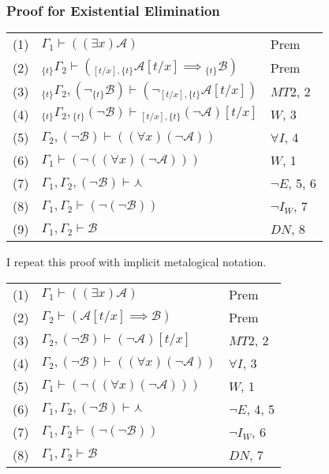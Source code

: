 \documentclass[12pt]{article}
\newcommand{\mc}[1]{\mathcal{#1}}
\begin{document}
\subsubsection*{Proof for Existential Elimination}

\begin{center}
\begin{tabular}{ p{1cm} p{7cm} p{3cm} }
(1) & $\Gamma_1 \vdash ((\exists x)\mc{A})$ & Prem\\
(2) & $_{\{t\}}\Gamma_2 \vdash ({_{[t/x], \{t\}}\mc{A}}[t/x] \implies {_{\{t\}}\mc{B}})$  & Prem\\
(3) & $_{\{t\}}\Gamma_2,  (\lnot {_{\{t\}}\mc{B}}) \vdash (\lnot {_{[t/x], \{t\}}\mc{A}}[t/x])$ & $MT2$, 2\\
(4) & $_{\{t\}} \Gamma_2, {_{\{t\}}(\lnot \mc{B})} \vdash {_{[t/x], \{t\}}(\lnot \mc{A})}[t/x]$ & $W$, 3\\
(5) & $\Gamma_2, (\lnot \mc{B}) \vdash ((\forall x)(\lnot \mc{A}))$ & $\forall I$, 4\\
(6) & $\Gamma_1 \vdash (\lnot ((\forall x)(\lnot \mc{A})))$ & $W$, 1\\
(7) & $\Gamma_1, \Gamma_2, (\lnot \mc{B}) \vdash \curlywedge$ & $\lnot E$, 5, 6\\
(8) & $\Gamma_1, \Gamma_2 \vdash (\lnot(\lnot \mc{B}))$ & $\lnot I_W$, 7\\
(9) & $\Gamma_1, \Gamma_2 \vdash \mc{B}$ & $DN$, 8
\end{tabular}
\end{center}

I repeat this proof with implicit metalogical notation.

\begin{center}
\begin{tabular}{ p{1cm} p{7cm} p{3cm} }
(1) & $\Gamma_1 \vdash ((\exists x)\mc{A})$ & Prem\\
(2) & $\Gamma_2 \vdash (\mc{A}[t/x] \implies \mc{B})$  & Prem\\
(3) & $\Gamma_2,  (\lnot \mc{B}) \vdash (\lnot \mc{A})[t/x]$ & $MT2$, 2\\
(4) & $\Gamma_2, (\lnot \mc{B}) \vdash ((\forall x)(\lnot \mc{A}))$ & $\forall I$, 3\\
(5) & $\Gamma_1 \vdash (\lnot ((\forall x)(\lnot \mc{A})))$ & $W$, 1\\
(6) & $\Gamma_1, \Gamma_2, (\lnot \mc{B}) \vdash \curlywedge$ & $\lnot E$, 4, 5\\
(7) & $\Gamma_1, \Gamma_2 \vdash (\lnot(\lnot \mc{B}))$ & $\lnot I_W$, 6\\
(8) & $\Gamma_1, \Gamma_2 \vdash \mc{B}$ & $DN$, 7
\end{tabular}
\end{center}
\end{document}
